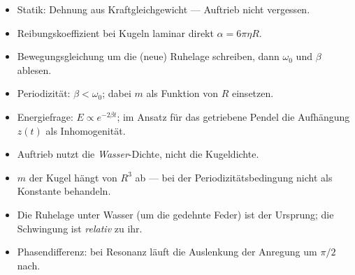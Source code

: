 \begin{werkzeugkasten}[Vorgehen]
\begin{itemize}
  \item Statik: Dehnung aus Kraftgleichgewicht --- Auftrieb nicht vergessen.
  \item Reibungskoeffizient bei Kugeln laminar direkt $\alpha=6\pi\eta R$.
  \item Bewegungsgleichung um die (neue) Ruhelage schreiben, dann $\omega_0$
       und $\beta$ ablesen.
  \item Periodizität: $\beta<\omega_0$; dabei $m$ als Funktion von $R$ einsetzen.
  \item Energiefrage: $E\propto e^{-2\beta t}$; im Ansatz für das getriebene
       Pendel die Aufhängung $z(t)$ als Inhomogenität.
\end{itemize}
\end{werkzeugkasten}

\begin{achtung}
\begin{itemize}
  \item Auftrieb nutzt die \emph{Wasser}-Dichte, nicht die Kugeldichte.
  \item $m$ der Kugel hängt von $R^3$ ab --- bei der Periodizitätsbedingung
       nicht als Konstante behandeln.
  \item Die Ruhelage unter Wasser (um die gedehnte Feder) ist der Ursprung;
       die Schwingung ist \emph{relativ} zu ihr.
  \item Phasendifferenz: bei Resonanz läuft die Auslenkung der Anregung um
       $\pi/2$ nach.
\end{itemize}
\end{achtung}
